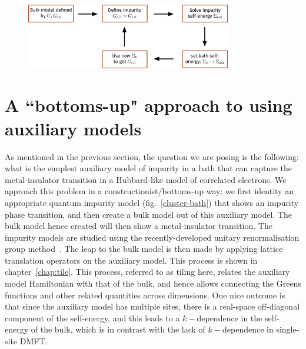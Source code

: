 \documentclass{report}
\numberwithin{equation}{section}
\begin{document}
\begin{figure}[!htb]
	\centering
	\includegraphics[width=0.8\textwidth]{dmft.pdf}
\end{figure}


\section{A ``bottoms-up" approach to using auxiliary models}
As mentioned in the previous section, the question we are posing is the following: what is the simplest auxiliary model of impurity in a bath that can capture the metal-insulator transition in a Hubbard-like model of correlated electrons. We approach this problem in a constructionist/bottoms-up way: we first identity an appropriate quantum impurity model (fig.~\ref{cluster-bath}) that shows an impurity phase transition, and then create a bulk model out of this auxiliary model. The bulk model hence created will then show a metal-insulator transition. The impurity models are studied using the recently-developed unitary renormalisation group method~\cite{anirbanmott1,anirbanmott2,anirbanurg1,anirbanurg2,siddharthacpi,santanukagome}. The leap to the bulk model is then made by applying lattice translation operators on the auxiliary model. This process is shown in chapter~\ref{chap:tile}. This process, referred to as tiling here, relates the auxiliary model Hamiltonian with that of the bulk, and hence allows connecting the Greens functions and other related quantities across dimensions. One nice outcome is that since the auxiliary model has multiple sites, there is a real-space off-diagonal component of the self-energy, and this leads to a \(k-\)dependence in the self-energy of the bulk, which is in contrast with the lack of \(k-\)dependence in single-site DMFT.  
\end{document}

